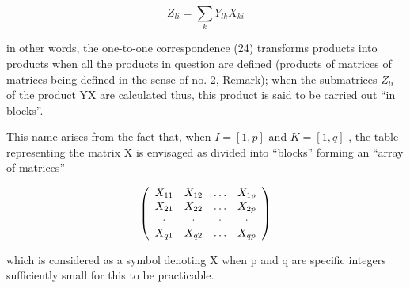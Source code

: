 \[
Z _ {l i} = \sum_ {k} Y _ {l k} X _ {k i}\tag{25}
\]

in other words, the one-to-one correspondence (24) transforms products into products when all the products in question are defined (products of matrices of matrices being defined in the sense of no. 2, Remark); when the submatrices \(Z_{li}\) of the product YX are calculated thus, this product is said to be carried out ``in blocks''.

This name arises from the fact that, when \(I = [1, p]\) and \(K = [1, q]\) , the table representing the matrix X is envisaged as divided into ``blocks'' forming an ``array of matrices''

\[
\left( \begin{array}{c c c c} X _ {1 1} & X _ {1 2} & \ldots & X _ {1 p} \\ X _ {2 1} & X _ {2 2} & \ldots & X _ {2 p} \\ \cdot & \cdot & \cdot & \cdot \\ X _ {q 1} & X _ {q 2} & \ldots & X _ {q p} \end{array} \right)
\]

which is considered as a symbol denoting X when p and q are specific integers sufficiently small for this to be practicable.

